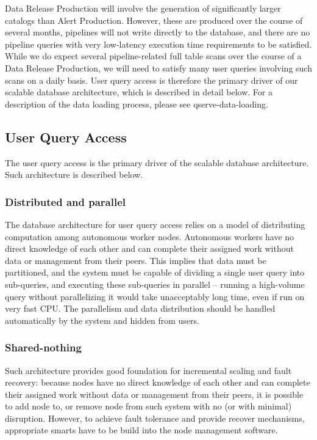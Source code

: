 \documentclass[DM,lsstdraft,toc]{lsstdoc}
\begin{document}
Data Release Production will involve the generation of significantly
larger catalogs than Alert Production. However, these are produced over
the course of several months, pipelines will not write directly to the
database, and there are no pipeline queries with very low-latency
execution time requirements to be satisfied. While we do expect several
pipeline-related full table scans over the course of a Data Release
Production, we will need to satisfy many user queries involving such
scans on a daily basis. User query access is therefore the primary
driver of our scalable database architecture, which is described in
detail below. For a description of the data loading process, please see
qserve-data-loading.

\subsection{User Query Access}\label{user-query-access}

The user query access is the primary driver of the scalable database
architecture. Such architecture is described below.

\subsubsection{Distributed and parallel}\label{distributed-and-parallel}

The database architecture for user query access relies on a model of
distributing computation among autonomous worker nodes. Autonomous
workers have no direct knowledge of each other and can complete their
assigned work without data or management from their peers. This implies
that data must be partitioned, and the system must be capable of
dividing a single user query into sub-queries, and executing these
sub-queries in parallel -- running a high-volume query without
parallelizing it would take unacceptably long time, even if run on very
fast CPU. The parallelism and data distribution should be handled
automatically by the system and hidden from users.

\subsubsection{Shared-nothing}\label{shared-nothing}

Such architecture provides good foundation for incremental scaling and
fault recovery: because nodes have no direct knowledge of each other and
can complete their assigned work without data or management from their
peers, it is possible to add node to, or remove node from such system
with no (or with minimal) disruption. However, to achieve fault
tolerance and provide recover mechanisms, appropriate smarts have to be
build into the node management software.
\end{document}
